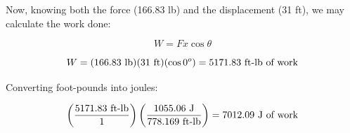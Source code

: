 Now, knowing both the force (166.83 lb) and the displacement (31 ft), we may calculate the work done:

$$W = F x \cos \theta$$

$$W = (166.83 \hbox{ lb})(31 \hbox{ ft})(\cos 0^o) = 5171.83 \hbox{ ft-lb of work}$$

Converting foot-pounds into joules:

$$\left(5171.83 \hbox{ ft-lb} \over 1 \right) \left(1055.06 \hbox{ J} \over 778.169 \hbox{ ft-lb} \right) = 7012.09 \hbox{ J of work}$$











